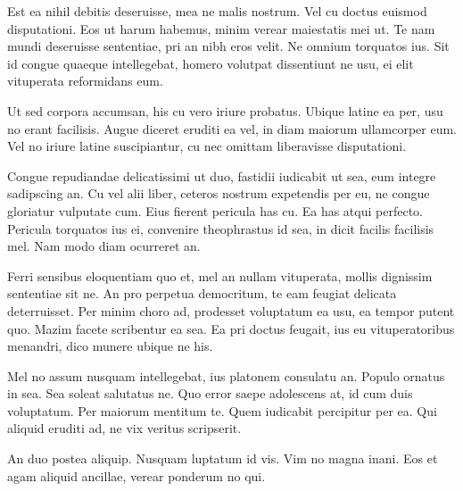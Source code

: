 Est ea nihil debitis deseruisse, mea ne malis nostrum. Vel cu doctus
euismod disputationi. Eos ut harum habemus, minim verear maiestatis mei
ut. Te nam mundi deseruisse sententiae, pri an nibh eros velit. Ne
omnium torquatos ius. Sit id congue quaeque intellegebat, homero
volutpat dissentiunt ne usu, ei elit vituperata reformidans eum.

Ut sed corpora accumsan, his cu vero iriure probatus. Ubique latine ea
per, usu no erant facilisis. Augue diceret eruditi ea vel, in diam
maiorum ullamcorper eum. Vel no iriure latine suscipiantur, cu nec
omittam liberavisse disputationi.

Congue repudiandae delicatissimi ut duo, fastidii iudicabit ut sea, eum
integre sadipscing an. Cu vel alii liber, ceteros nostrum expetendis per
eu, ne congue gloriatur vulputate cum. Eius fierent pericula has cu. Ea
has atqui perfecto. Pericula torquatos ius ei, convenire theophrastus id
sea, in dicit facilis facilisis mel. Nam modo diam ocurreret an.

Ferri sensibus eloquentiam quo et, mel an nullam vituperata, mollis
dignissim sententiae sit ne. An pro perpetua democritum, te eam feugiat
delicata deterruisset. Per minim choro ad, prodesset voluptatum ea usu,
ea tempor putent quo. Mazim facete scribentur ea sea. Ea pri doctus
feugait, ius eu vituperatoribus menandri, dico munere ubique ne his.

Mel no assum nusquam intellegebat, ius platonem consulatu an. Populo
ornatus in sea. Sea soleat salutatus ne. Quo error saepe adolescens at,
id cum duis voluptatum. Per maiorum mentitum te. Quem iudicabit
percipitur per ea. Qui aliquid eruditi ad, ne vix veritus scripserit.

An duo postea aliquip. Nusquam luptatum id vis. Vim no magna inani. Eos
et agam aliquid ancillae, verear ponderum no qui.

